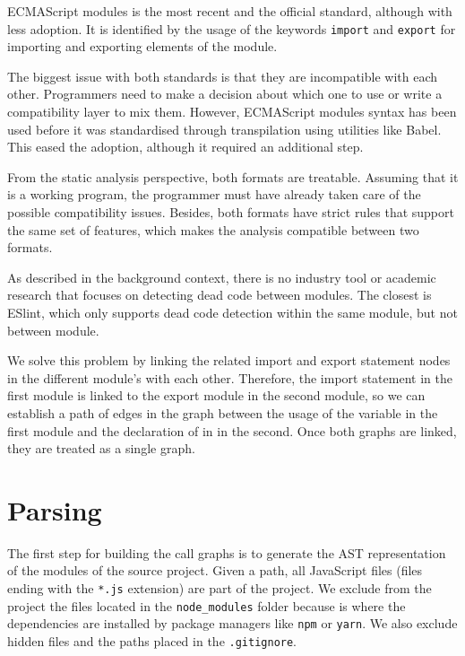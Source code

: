 \documentclass{uvamscse}
\begin{document}
ECMAScript modules is the most recent and the official standard, although with less adoption. It  is identified by the usage of the keywords \texttt{import} and \texttt{export} for importing and exporting elements of the module.

The biggest issue with both standards is that they are incompatible with each other. Programmers need to make a decision about which one to use or write a compatibility layer to mix them. However, ECMAScript modules syntax has been used before it was standardised through transpilation using utilities like Babel. This eased the adoption, although it required an additional step.

From the static analysis perspective, both formats are treatable. Assuming that it is a working program, the programmer must have already taken care of the possible compatibility issues. Besides, both formats have strict rules that support the same set of features, which makes the analysis compatible between two formats.

As described in the background context, there is no industry tool or academic research that focuses on detecting dead code between modules. The closest is ESlint, which only supports dead code detection within the same module, but not between module.

We solve this problem by linking the related import and export statement nodes in the different module's with each other. Therefore, the import statement in the first module is linked to the export module in the second module, so we can establish a path of edges in the graph between the usage of the variable in the first module and the declaration of in in the second. Once both graphs are linked, they are treated as a single graph.

\section{Parsing}
The first step for building the call graphs is to generate the AST representation of the modules of the source project. Given a path, all JavaScript files (files ending with the \texttt{*.js} extension) are part of the project. We exclude from the project the files located in the \texttt{node\_modules} folder because is where the dependencies are installed by package managers like \texttt{npm} or \texttt{yarn}. We also exclude hidden files and the paths placed in the \texttt{.gitignore}.
\end{document}
